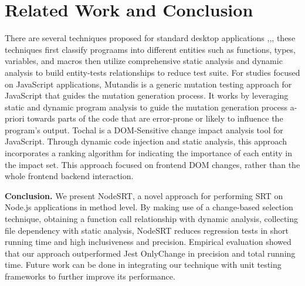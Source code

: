 \documentclass[10pt, conference]{IEEEtran}
\begin{document}
\section{Related Work and Conclusion}
There are several techniques proposed for standard desktop applications \cite{b2, b4, b7, b9, b12},\cite{b13},\cite{b14, b17}, these techniques 
first classify prograams into different entities such as functions, types, variables, and macros then utilize comprehensive static analysis 
and dynamic analysis to build entity-tests relationships to reduce test suite.
For studies focused on JavaScript applications, Mutandis \cite{b11} is a generic mutation testing 
approach for JavaScript that guides the mutation generation process. It works by leveraging static and dynamic program 
analysis to guide the mutation generation process a-priori towards parts of the code that are error-prone or 
likely to influence the program’s output. 
Tochal \cite{b1} is a DOM-Sensitive change impact analysis tool for JavaScript. Through dynamic code injection and static analysis, this 
approach incorporates a ranking algorithm for indicating the importance of each entity in the impact set. This 
approach focused on frontend DOM changes, rather than the whole frontend backend interaction.


\textbf{Conclusion.} We present NodeSRT, a novel approach for performing SRT on Node.js applications in method level. By making use of a change-based selection technique, 
obtaining a function call relationship with dynamic analysis, collecting file dependency with static analysis, NodeSRT reduces regression tests in short running time
and high inclusiveness and precision. Empirical evaluation showed that our approach outperformed Jest OnlyChange in precision and total running time. Future work can 
be done in integrating our technique with unit testing frameworks to further improve its performance.
\end{document}
